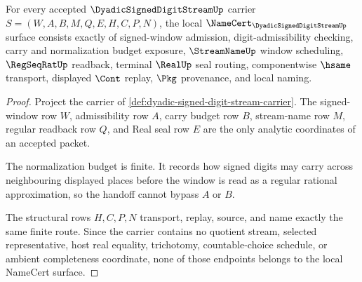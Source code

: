 \begin{theorem}
\label{thm:dyadic-signed-digit-stream-namecert-obligations}
For every accepted $\DyadicSignedDigitStreamUp$ carrier $S=(W,A,B,M,Q,E,H,C,P,N)$, the local $\NameCert_{\DyadicSignedDigitStreamUp}$ surface consists exactly of signed-window admission, digit-admissibility checking, carry and normalization budget exposure, $\StreamNameUp$ window scheduling, $\RegSeqRatUp$ readback, terminal $\RealUp$ seal routing, componentwise $\hsame$ transport, displayed $\Cont$ replay, $\Pkg$ provenance, and local naming.
\end{theorem}
\begin{proof}
Project the carrier of \autoref{def:dyadic-signed-digit-stream-carrier}. The signed-window row $W$, admissibility row $A$, carry budget row $B$, stream-name row $M$, regular readback row $Q$, and Real seal row $E$ are the only analytic coordinates of an accepted packet.

The normalization budget is finite. It records how signed digits may carry across neighbouring displayed places before the window is read as a regular rational approximation, so the handoff cannot bypass $A$ or $B$.

The structural rows $H,C,P,N$ transport, replay, source, and name exactly the same finite route. Since the carrier contains no quotient stream, selected representative, host real equality, trichotomy, countable-choice schedule, or ambient completeness coordinate, none of those endpoints belongs to the local NameCert surface.
\end{proof}

